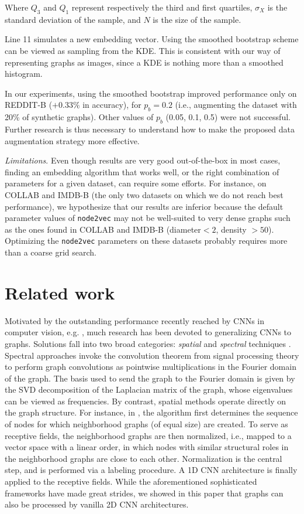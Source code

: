 \documentclass[runningheads]{llncs}
\begin{document}
Where $Q_{3}$ and $Q_{1}$ represent respectively the third and first quartiles, $\sigma_{X}$ is the standard deviation of the sample, and $N$ is the size of the sample.

Line 11 simulates a new embedding vector. Using the smoothed bootstrap scheme can be viewed as sampling from the KDE. This is consistent with our way of representing graphs as images, since a KDE is nothing more than a smoothed histogram.

In our experiments, using the smoothed bootstrap improved performance only on REDDIT-B ($+0.33\%$ in accuracy), for $p_b=0.2$ (i.e., augmenting the dataset with 20\% of synthetic graphs). Other values of $p_b$ (0.05, 0.1, 0.5) were not successful. Further research is thus necessary to understand how to make the proposed data augmentation strategy more effective.

\textit{Limitations}. Even though results are very good out-of-the-box in most cases, finding an embedding algorithm that works well, or the right combination of parameters for a given dataset, can require some efforts. For instance, on COLLAB and IMDB-B (the only two datasets on which we do not reach best performance), we hypothesize that our results are inferior because the default parameter values of \texttt{node2vec} may not be well-suited to very dense graphs such as the ones found in COLLAB and IMDB-B (diameter$<2$, density $>50$). Optimizing the \texttt{node2vec} parameters on these datasets probably requires more than a coarse grid search.

\section{Related work}
Motivated by the outstanding performance recently reached by CNNs in computer vision, e.g. \cite{vinyals2015show,krizhevsky2012imagenet}, much research has been devoted to generalizing CNNs to graphs.
Solutions fall into two broad categories: \textit{spatial} and \textit{spectral} techniques \cite{bruna2013spectral}. Spectral approaches \cite{defferrard2016convolutional,kipf2016semi} invoke the convolution theorem from signal processing theory to perform graph convolutions as pointwise multiplications in the Fourier domain of the graph. The basis used to send the graph to the Fourier domain is given by the SVD decomposition of the Laplacian matrix of the graph, whose eigenvalues can be viewed as frequencies. By contrast, spatial methods \cite{zhang2018end,niepert2016learning,vialatte2016generalizing} operate directly on the graph structure. For instance, in \cite{niepert2016learning}, the algorithm first determines the sequence of nodes for which neighborhood graphs (of equal size) are created. To serve as receptive fields, the neighborhood graphs are then normalized, i.e., mapped to a vector space with a linear order, in which nodes with similar structural roles in the neighborhood graphs are close to each other. Normalization is the central step, and is performed via a labeling procedure. A 1D CNN architecture is finally applied to the receptive fields.
While the aforementioned sophisticated frameworks have made great strides, we showed in this paper that graphs can also be processed by vanilla 2D CNN architectures.
\end{document}
